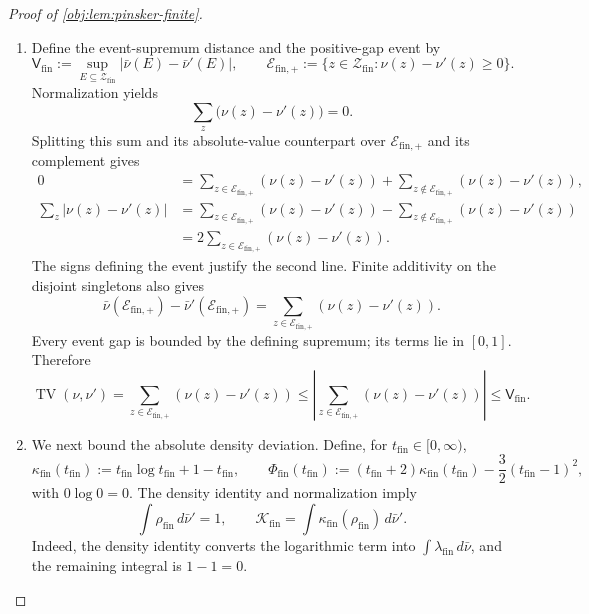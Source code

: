 \begin{proof}[Proof of \cref{obj:lem:pinsker-finite}]
\begin{enumerate}
\item Define the event-supremum distance and the positive-gap event by
\[
\mathsf V_{\mathrm{fin}}
:=\sup_{E\subseteq\mathcal Z_{\mathrm{fin}}}
  |\bar\nu(E)-\bar\nu'(E)|,
\qquad
\mathcal E_{\mathrm{fin},+}
:=\{z\in\mathcal Z_{\mathrm{fin}}:\nu(z)-\nu'(z)\ge0\}.
\]
Normalization yields
\[
\sum_z\bigl(\nu(z)-\nu'(z)\bigr)=0.
\]
Splitting this sum and its absolute-value counterpart over
\(\mathcal E_{\mathrm{fin},+}\) and its complement gives
\[
\begin{aligned}
0
&=\sum_{z\in\mathcal E_{\mathrm{fin},+}}(\nu(z)-\nu'(z))
 +\sum_{z\notin\mathcal E_{\mathrm{fin},+}}(\nu(z)-\nu'(z)),\\
\sum_z|\nu(z)-\nu'(z)|
&=\sum_{z\in\mathcal E_{\mathrm{fin},+}}(\nu(z)-\nu'(z))
 -\sum_{z\notin\mathcal E_{\mathrm{fin},+}}(\nu(z)-\nu'(z))\\
&=2\sum_{z\in\mathcal E_{\mathrm{fin},+}}(\nu(z)-\nu'(z)).
\end{aligned}
\]
The signs defining the event justify the second line. Finite additivity on the disjoint singletons also gives
\[
\bar\nu(\mathcal E_{\mathrm{fin},+})
-\bar\nu'(\mathcal E_{\mathrm{fin},+})
=\sum_{z\in\mathcal E_{\mathrm{fin},+}}(\nu(z)-\nu'(z)).
\]
Every event gap is bounded by the defining supremum; its terms lie in \([0,1]\). Therefore
\[
\operatorname{TV}(\nu,\nu')
=\sum_{z\in\mathcal E_{\mathrm{fin},+}}(\nu(z)-\nu'(z))
\le
\left|\sum_{z\in\mathcal E_{\mathrm{fin},+}}(\nu(z)-\nu'(z))\right|
\le\mathsf V_{\mathrm{fin}}.
\]

\item We next bound the absolute density deviation. Define, for \(t_{\mathrm{fin}}\in[0,\infty)\),
\[
\kappa_{\mathrm{fin}}(t_{\mathrm{fin}})
:=t_{\mathrm{fin}}\log t_{\mathrm{fin}}+1-t_{\mathrm{fin}},
\qquad
\Phi_{\mathrm{fin}}(t_{\mathrm{fin}})
:=(t_{\mathrm{fin}}+2)\kappa_{\mathrm{fin}}(t_{\mathrm{fin}})
-\frac32(t_{\mathrm{fin}}-1)^2,
\]
with \(0\log0=0\). The density identity and normalization imply
\[
\int\rho_{\mathrm{fin}}\,d\bar\nu'=1,
\qquad
\mathcal K_{\mathrm{fin}}
=\int\kappa_{\mathrm{fin}}(\rho_{\mathrm{fin}})\,d\bar\nu'.
\]
Indeed, the density identity converts the logarithmic term into
\(\int\lambda_{\mathrm{fin}}\,d\bar\nu\), and the remaining integral is \(1-1=0\).


\end{enumerate}
\end{proof}
